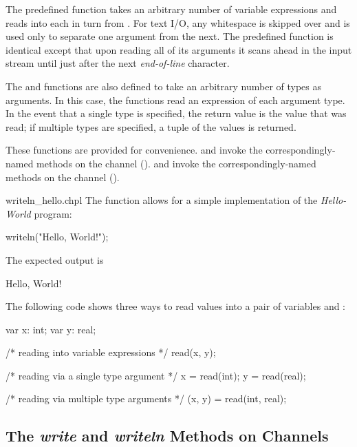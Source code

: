 The predefined function  takes an arbitrary number of
variable expressions and reads into each in turn from .
For text I/O, any whitespace is skipped over and is used only to separate one
argument from the next.  The predefined function  is
identical except that upon reading all of its arguments it scans ahead
in the input stream until just after the next {\em end-of-line}
character.

The  and  functions are also defined to take
an arbitrary number of types as arguments.  In this case, the
functions read an expression of each argument type.  In the event that
a single type is specified, the return value is the value that was
read; if multiple types are specified, a tuple of the values is
returned.

These functions are provided for convenience.
 and  invoke the correspondingly-named methods
on the  channel ().
 and  invoke the correspondingly-named methods
on the  channel ().

\begin{chapelexample}{writeln_hello.chpl}
The  function allows for a simple implementation
of the {\em Hello-World} program:
\begin{chapel}
writeln("Hello, World!");
\end{chapel}
The expected output is
\begin{chapelprintoutput}{}
Hello, World!
\end{chapelprintoutput}
\end{chapelexample}

\begin{example}
The following code shows three ways to read values into a pair of
variables  and :
\begin{chapel}
var x: int;
var y: real;

/* reading into variable expressions */
read(x, y);

/* reading via a single type argument */
x = read(int);
y = read(real);

/* reading via multiple type arguments */
(x, y) = read(int, real);
\end{chapel}
\end{example}

\label{User_Defined_writeThis_Methods}

\subsection{The {\em write} and {\em writeln} Methods on Channels}
\label{IO_channel_write}

